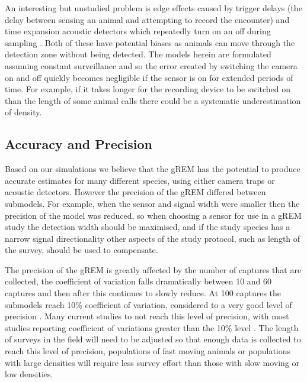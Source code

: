 \documentclass[a4paper,10pt,reqno,oneside]{amsart}
\begin{document}
An interesting but unstudied problem is edge effects caused by trigger delays (the delay between sensing an animal and attempting to record the encounter) \citep{rovero2013camera} and time expansion acoustic detectors which repeatedly turn on an off during sampling \citep{ahlen1999use}. Both of these have potential biases as animals can move through the detection zone without being detected. The models herein are formulated assuming constant surveillance and so the error created by switching the camera on and off quickly becomes negligible if the sensor is on for extended periods of time. For example, if it takes longer for the recording device to be switched on than the length of some animal calls there could be a systematic underestimation of density.


\subsection*{Accuracy and Precision}
Based on our simulations we believe that the gREM has the potential to produce accurate estimates for many different species, using either camera traps or acoustic detectors. However the precision of the gREM differed between submodels. For example, when the sensor and signal width were smaller then the precision of the model was reduced, so when choosing a sensor for use in a gREM study the detection width should be maximised, and if the study species has a narrow signal directionality other aspects of the study protocol, such as length of the survey, should be used to compensate. 

The precision of the gREM is greatly affected by the number of captures that are collected, the coefficient of variation falls dramatically between 10 and 60 captures and then after this continues to slowly reduce. At 100 captures the submodels reach 10\% coefficient of variation, considered to a very good level of precision \citep{thomas2012passive}. Many current studies to not reach this level of precision, with most studies reporting coefficient of variations greater than the 10\% level \citep{o2003crouching, proctor2010ecological, foster2012critique}. The length of surveys in the field will need to be adjusted so that enough data is collected to reach this level of precision, populations of fast moving animals or populations with large densities will require less survey effort than those with slow moving or low densities. 
\end{document}
